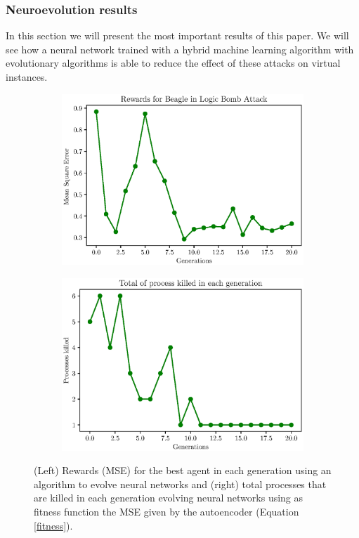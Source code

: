 \documentclass{iosart2c}
\begin{document}
\subsubsection{Neuroevolution results}

In this section we will present the most important results of this paper. We will see how a neural network trained with a hybrid machine learning algorithm with evolutionary algorithms is able to reduce the effect of these attacks on virtual instances. \\


\begin{figure}[h!]
\begin{subfigure}{.49\linewidth}
\centering
\includegraphics[width=\linewidth]{figs/results/reward_best_agent_final.eps}
\end{subfigure}
\begin{subfigure}{.49\linewidth}
\centering
\includegraphics[width=\linewidth]{figs/results/number_process_final_top_agent.eps}
\end{subfigure}
\caption{(Left) Rewards (MSE) for the best agent in each generation using an algorithm to evolve neural networks and (right) total processes that are killed in each generation evolving neural networks using as fitness function the MSE given by the autoencoder (Equation \ref{fitness}).}
\label{fig:reward_top_agent}
\end{figure}
\end{document}
